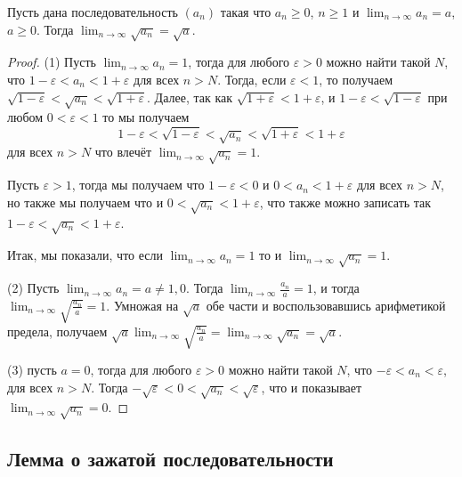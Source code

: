\begin{proposition}
 Пусть дана последовательность $(a_n )$ такая что $a_n \ge 0$, $n\ge 1$ и $\lim_{n \to \infty} a_n = a$, $a \ge 0$. Тогда $\lim_{n \to \infty}\sqrt{a_n} = \sqrt{a}.$
\end{proposition}
\begin{proof}
 (1) Пусть $\lim_{n \to \infty}a_n = 1$, тогда для любого $\varepsilon>0$ можно найти такой $N$, что $1 - \varepsilon <a_n<1 + \varepsilon$ для всех $n >N$. Тогда, если $\varepsilon<1$, то получаем $\sqrt{1-\varepsilon} < \sqrt{a_n} <\sqrt{1+\varepsilon}$. Далее, так как $\sqrt{1+\varepsilon} < 1 + \varepsilon$, и $1-\varepsilon < \sqrt{1-\varepsilon}$ при любом $0 <\varepsilon<1$ то мы получаем
 \[
  1 -\varepsilon < \sqrt{1-\varepsilon} < \sqrt{a_n} < \sqrt{1+\varepsilon} < 1 + \varepsilon
 \]
для всех $n > N$ что влечёт $\lim_{n \to \infty}\sqrt{a_n} =1$.

 Пусть $\varepsilon >1$, тогда мы получаем что $1 - \varepsilon <0$ и $0 < a_n  < 1 +\varepsilon$ для всех $n >N$, но также мы получаем что и $0 < \sqrt{a_n} < 1 + \varepsilon$, что также можно записать так $1- \varepsilon < \sqrt{a_n} < 1 + \varepsilon$.

 Итак, мы показали, что если $\lim_{n \to \infty}a_n = 1$ то и $\lim_{n \to \infty}\sqrt{a_n} = 1.$

 (2) Пусть $\lim_{n \to \infty}a_n = a \ne 1,0.$ Тогда $\lim_{n \to \infty} \frac{a_n}{a} = 1$, и тогда $\lim_{n \to \infty}\sqrt{\frac{a_n}{a}} = 1$. Умножая на $\sqrt{a}$ обе части и воспользовавшись арифметикой предела, получаем $\sqrt{a} \lim_{n \to \infty}\sqrt{\frac{a_n}{a}} = \lim_{n \to \infty}\sqrt{a_n} = \sqrt{a}$.

 (3) пусть $a = 0$, тогда для любого $\varepsilon>0$ можно найти такой $N$, что $-\varepsilon < a_n <\varepsilon$, для всех $n>N$. Тогда $-\sqrt{\varepsilon} < 0 < \sqrt{a_n} < \sqrt{\varepsilon}$, что и показывает $\lim_{n\to \infty} \sqrt{a_n} = 0.$
\end{proof}


\subsection{Лемма о зажатой последовательности}

